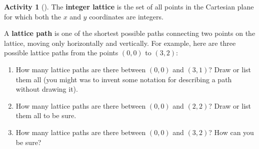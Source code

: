 \documentclass[10pt,]{book}
\newcommand{\terminology}[1]{\textbf{#1}}
\theoremstyle{plain}
\theoremstyle{definition}
\theoremstyle{definition}
\theoremstyle{definition}
\newtheorem{activity}[project]{Activity}
\theoremstyle{definition}
\numberwithin{equation}{chapter}
\begin{document}
\begin{activity}[]\label{activity-7}
\hypertarget{p-389}{}%
The \terminology{integer lattice} is the set of all points in the Cartesian plane for which both the \(x\) and \(y\) coordinates are integers.%
\par
\hypertarget{p-390}{}%
A \terminology{lattice path} is one of the shortest possible paths connecting two points on the lattice, moving only horizontally and vertically. For example, here are three possible lattice paths from the points \((0,0)\) to \((3,2)\):%
\begin{sidebyside}{3}{0.0166666666666667}{0.0166666666666667}{0.0333333333333333}
\begin{sbspanel}{0.3}
\end{sbspanel}
\begin{sbspanel}{0.3}
\end{sbspanel}
\begin{sbspanel}{0.3}
\end{sbspanel}
\end{sidebyside}
\begin{enumerate}[font=\bfseries,label=(\alph*),ref=\alph*]
\item\label{task-7} \hypertarget{p-391}{}%
How many lattice paths are there between \((0,0)\) and \((3,1)\)?  Draw or list them all (you might was to invent some notation for describing a path without drawing it).%
\item\label{task-8} \hypertarget{p-392}{}%
How many lattice paths are there between \((0,0)\) and \((2,2)\)? Draw or list them all to be sure.%
\item\label{task-9} \hypertarget{p-393}{}%
How many lattice paths are there between \((0,0)\) and \((3,2)\)? How can you be sure?%
\end{enumerate}
\end{activity}
\end{document}
